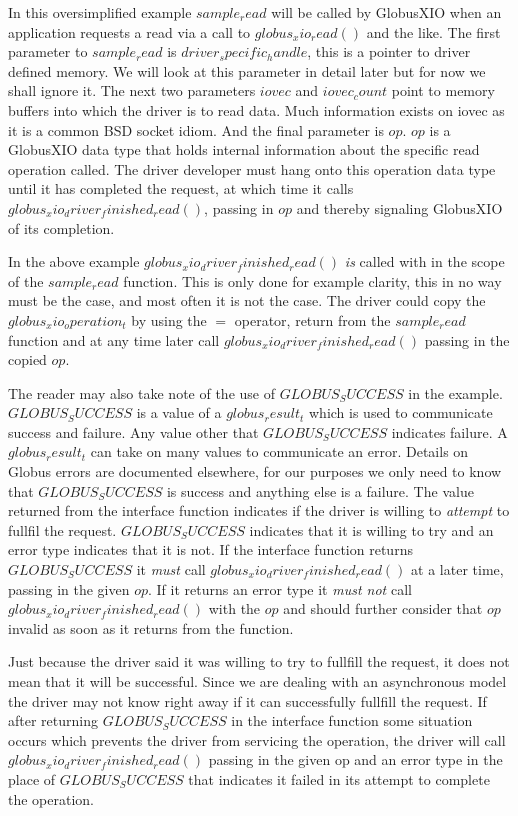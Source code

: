 \documentclass[11pt]{article}
\begin{document}
In this oversimplified example $sample_read$ will be called
by GlobusXIO when an application requests a read via a call to
$globus_xio_read()$ and the like.  The first parameter to
$sample_read$ is $driver_specific_handle$, this is a pointer
to driver defined memory.  We will look at this parameter in detail
later but for now we shall ignore it.  The next two parameters 
$iovec$ and $iovec_count$ point to memory buffers into which
the driver is to read data.  Much information exists on iovec as it 
is a common BSD socket idiom.  And the final parameter is $op$.
$op$ is a GlobusXIO data type that holds internal information about
the specific read operation called.  The driver developer must 
hang onto this operation data type until it has completed the request,
at which time it calls $globus_xio_driver_finished_read()$, passing
in $op$ and thereby signaling GlobusXIO of its completion.

In the above example $globus_xio_driver_finished_read()$ \emph{is} called
with in the scope of the $sample_read$ function.  This is only done
for example clarity, this in no way must be the case, and most often
it is not the
case.  The driver could copy the $globus_xio_operation_t$ by using
the $=$ operator, return from the $sample_read$ function and at any time
later call $globus_xio_driver_finished_read()$ passing in the copied
$op$.

The reader may also take note of the use of $GLOBUS_SUCCESS$ in the example.
$GLOBUS_SUCCESS$ is a value of a $globus_result_t$ which is used to
communicate success and failure.  Any value other that $GLOBUS_SUCCESS$
indicates failure.  A $globus_result_t$ can take on many values to
communicate an error.  Details on Globus errors are documented 
elsewhere, for our purposes we only need to know that $GLOBUS_SUCCESS$ 
is success and anything else is a failure.
The value  returned from the interface function indicates
if the driver is willing to \emph{attempt} to fullfil the request.  
$GLOBUS_SUCCESS$ indicates that it is willing to try and an error
type indicates that it is not.  
If the interface function returns $GLOBUS_SUCCESS$
it \emph{must} call $globus_xio_driver_finished_read()$ at a later time, 
passing in the given $op$.  If it returns
an error type it \emph{must not} call $globus_xio_driver_finished_read()$
with the $op$ and should further consider that $op$ invalid as soon as it
returns from the function.

Just because the driver said it was willing to try to fullfill the
request, it does not mean that it will be successful.  Since we are
dealing with an asynchronous model the driver may not know right away
if it can successfully fullfill the request.  If after returning 
$GLOBUS_SUCCESS$ in the interface function some situation occurs 
which prevents the driver from servicing
the operation, the driver will call $globus_xio_driver_finished_read()$
passing in the given op and an error type in the place of $GLOBUS_SUCCESS$
that indicates it failed in its attempt to complete the operation.
\end{document}
